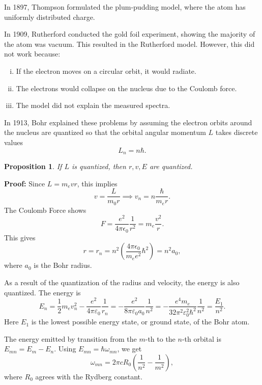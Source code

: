 \documentclass[12pt]{article}
\newtheorem{proposition}{Proposition}[section]
\theoremstyle{definition}
\theoremstyle{remark}
\begin{document}
In 1897, Thompson formulated the plum-pudding model, where the atom has uniformly distributed charge.

In 1909, Rutherford conducted the gold foil experiment, showing the majority of the atom was vacuum. This resulted in the Rutherford model. However, this did not work because:
\begin{enumerate}[(i)]
	\item If the electron moves on a circular orbit, it would radiate.
	\item The electrons would collapse on the nucleus due to the Coulomb force.
	\item The model did not explain the measured spectra.
\end{enumerate}

In 1913, Bohr explained these problems by assuming the electron orbits around the nucleus are quantized so that the orbital angular momentum $L$ takes discrete values
\[
L_n = n \hbar
.\]
\begin{proposition}
	If $L$ is quantized, then $r, v, E$ are quantized.
\end{proposition}

\begin{adjustbox}{minipage = \columnwidth - 25.5pt, margin=1em, frame=1pt, margin=0em}
\textbf{Proof:} Since $L = m_e v r$, this implies
\[
v = \frac{L}{m_0 r} \implies v_n = n \frac{\hbar}{m_e r}
.\]
The Coulomb Force shows
\[
	F = \frac{e^2}{4 \pi \epsilon_0} \frac{1}{r^2} = m_e \frac{v^2}{r}
.\]
This gives
\[
	r = r_n = n^2 \left( \frac{4 \pi \epsilon_0}{m_e e^2}\hbar ^2 \right) = n^2 a_0
,\]
where $a_0$ is the Bohr radius.
\end{adjustbox}

\begin{adjustbox}{minipage = \columnwidth - 25.5pt, margin=1em, frame=1pt, margin=0em}
As a result of the quantization of the radius and velocity, the energy is also quantized. The energy is
\[
E_n = \frac{1}{2} m_e v_n^2 - \frac{e^2}{4 \pi \varepsilon_0} \frac{1}{r_n} = - \frac{e^2}{8 \pi \varepsilon_0 a_0} \frac{1}{n^2} = - \frac{e^{4} m_e}{32 \pi^2 \varepsilon_0^2 \hbar^2} \frac{1}{n^2} = \frac{E_1}{n^2}
.\]
Here $E_1$ is the lowest possible energy state, or ground state, of the Bohr atom.

\end{adjustbox}


The energy emitted by transition from the $m$-th to the $n$-th orbital is $E_{mn} = E_m - E_n$. Using $E_{mn} = \hbar \omega_{mn}$, we get
\[
	\omega_{mn} = 2 \pi c R_0 \left( \frac{1}{n^2} - \frac{1}{m^2} \right)
,\]
where $R_0$ agrees with the Rydberg constant.
\end{document}
